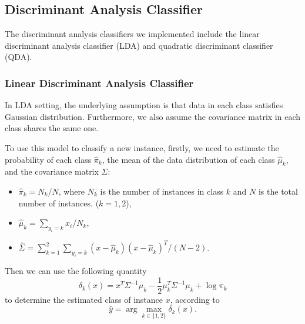 \documentclass[english]{article}
\begin{document}
\subsection{Discriminant Analysis Classifier}
\label{DA}
\par The discriminant analysis classifiers we implemented include the linear discriminant analysis classifier (LDA) and quadratic discriminant classifier (QDA).
\subsubsection{Linear Discriminant Analysis Classifier}
\par In LDA setting, the underlying assumption is that data in each class satisfies Gaussian distribution. Furthermore, we also assume the covariance matrix in each class shares the same one. 
\par To use this model to classify a new instance, firstly, we need to estimate the probability of each class $\hat{\pi}_{k}$, the mean of the data distribution of each class $\hat{\mu}_{k}$, and the covariance matrix $\Sigma$:
\begin{itemize}
	\item $\hat{\pi}_{k} = N_{k} / N$, where $N_{k}$ is the number of instances in class $k$ and $N$ is the total number of instances. ($k = 1, 2$),
	\item $\hat{\mu}_{k} = \sum_{y_{i} = k}x_{i} / N_{k}$,
	\item $\hat{\Sigma} = \sum_{k=1}^{2}\sum_{y_{i} = k}(x - \hat{\mu}_{k})(x - \hat{\mu}_{k})^{T} / (N - 2)$.
\end{itemize}
Then we can use the following quantity
\begin{equation}
	\delta_{k}(x) = x^{T}\Sigma^{-1}\mu_{k} - \frac{1}{2}\mu_{k}^{T}\Sigma^{-1}\mu_{k} + \log\pi_{k}
\end{equation}
to determine the estimated class of instance $x$, according to
\begin{equation}
	\hat{y} = \arg\max_{k\in\{1, 2\}}\delta_{k}(x).
\end{equation}
\end{document}

